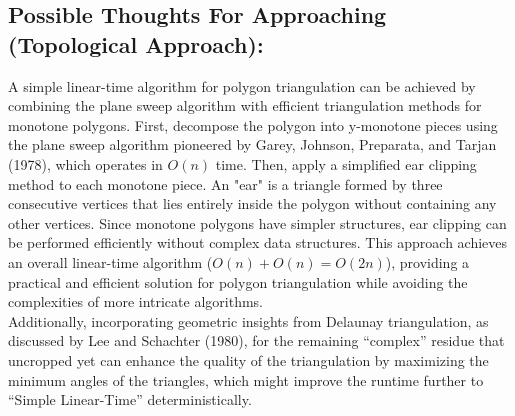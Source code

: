 \documentclass{article}
\begin{document}
\subsection*{Possible Thoughts For Approaching (Topological Approach):}
A simple linear-time algorithm for polygon triangulation can be achieved by combining the plane sweep algorithm with efficient triangulation methods for monotone polygons. First, decompose the polygon into y-monotone pieces using the plane sweep algorithm pioneered by Garey, Johnson, Preparata, and Tarjan (1978), which operates in \( O(n) \) time. Then, apply a simplified ear clipping method to each monotone piece. An "ear" is a triangle formed by three consecutive vertices that lies entirely inside the polygon without containing any other vertices. Since monotone polygons have simpler structures, ear clipping can be performed efficiently without complex data structures. This approach achieves an overall linear-time algorithm (\( O(n) + O(n) = O(2n) \)), providing a practical and efficient solution for polygon triangulation while avoiding the complexities of more intricate algorithms.
\\
Additionally, incorporating geometric insights from Delaunay triangulation, as discussed by Lee and Schachter (1980), for the remaining ``complex'' residue that uncropped yet can enhance the quality of the triangulation by maximizing the minimum angles of the triangles, which might improve the runtime further to ``Simple Linear-Time'' deterministically.

\newpage
\end{document}
